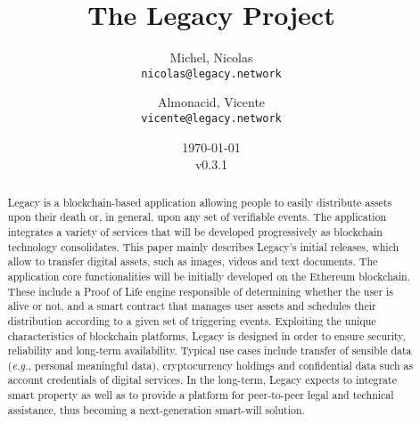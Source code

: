 \documentclass[12pt,english,spanish,notitlepage]{report} %
\title{The Legacy Project\\[Versión en Español]}
\author{
  Michel, Nicolas\\
  \texttt{nicolas@legacy.network}
  \and
  Almonacid, Vicente\\
  \texttt{vicente@legacy.network}
}
\date{\today\\v0.3.1}
\newcommand{\bibpath}{.}
\begin{document}

\maketitle
\begin{abstract}
    Legacy is a blockchain-based application allowing people to easily distribute assets upon their death or, in general, upon any set of verifiable events.
    The application integrates a variety of services that will be developed progressively as blockchain technology consolidates. 
    This paper mainly describes Legacy's initial releases, which allow to transfer digital assets, such as images, videos and text documents. 
    The application core functionalities will be initially developed on the Ethereum blockchain. These include a Proof of Life engine responsible of determining whether the user is alive or not, and a smart contract that manages user assets and schedules their distribution according to a given set of triggering events.
    Exploiting the unique characteristics of blockchain platforms, Legacy is designed in order to ensure security, reliability and long-term availability. 
    Typical use cases include transfer of sensible data (\textit{e.g.}, personal meaningful data), cryptocurrency holdings and confidential data such as account credentials of digital services. 
    In the long-term, Legacy expects to integrate smart property as well as to provide a platform for peer-to-peer legal and technical assistance, thus becoming a next-generation smart-will solution.

\end{abstract}



\tableofcontents




%



%

%
%



%
%
%
%
\printbibliography
\end{document}
